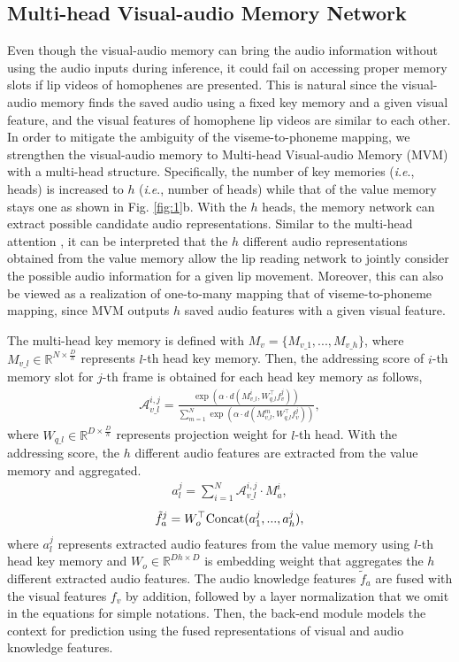 \documentclass[letterpaper]{article} \usepackage{aaai22}  \usepackage{times}  \usepackage{helvet}  \usepackage{courier}  \usepackage[hyphens]{url}  \usepackage{graphicx} \urlstyle{rm} \def\UrlFont{\rm}  \usepackage{natbib}  \usepackage{caption} \DeclareCaptionStyle{ruled}{labelfont=normalfont,labelsep=colon,strut=off} \frenchspacing  \setlength{\pdfpagewidth}{8.5in}  \setlength{\pdfpageheight}{11in}  \usepackage{algorithm}
\newcommand{\ie}{\textit{i}.\textit{e}.}
\begin{document}
\subsection{Multi-head Visual-audio Memory Network}
\label{sec:3.2}
Even though the visual-audio memory can bring the audio information without using the audio inputs during inference, it could fail on accessing proper memory slots if lip videos of homophenes are presented. This is natural since the visual-audio memory finds the saved audio using a fixed key memory and a given visual feature, and the visual features of homophene lip videos are similar to each other. In order to mitigate the ambiguity of the viseme-to-phoneme mapping, we strengthen the visual-audio memory to Multi-head Visual-audio Memory (MVM) with a multi-head structure. Specifically, the number of key memories (\ie, heads) is increased to $h$ (\ie, number of heads) while that of the value memory stays one \cite{lample2019mhmattention} as shown in Fig. \ref{fig:1}b. With the $h$ heads, the memory network can extract possible candidate audio representations. Similar to the multi-head attention \cite{vaswani2017attention}, it can be interpreted that the $h$ different audio representations obtained from the value memory allow the lip reading network to jointly consider the possible audio information for a given lip movement. Moreover, this can also be viewed as a realization of one-to-many mapping that of viseme-to-phoneme mapping, since MVM outputs $h$ saved audio features with a given visual feature.

The multi-head key memory is defined with $M_v=\{M_{v\_1}, ..., M_{v\_h}\}$, where $M_{v\_l}\in\mathbb{R}^{N\times \frac{D}{h}}$ represents $l$-th head key memory. Then, the addressing score of $i$-th memory slot for $j$-th frame is obtained for each head key memory as follows,
\begin{align}
    \mathcal{A}_{v\_l}^{i,j} = \frac{\exp(\alpha\cdot d(M_{v\_l}^i,W_{q\_l}^\top f_v^j))}{\sum_{m=1}^N \exp(\alpha\cdot d(M_{v\_l}^m,W_{q\_l}^\top f_v^j))},
\end{align}
where $W_{q\_l}\in\mathbb{R}^{D\times\frac{D}{h}}$ represents projection weight for $l$-th head. With the addressing score, the $h$ different audio features are extracted from the value memory and aggregated.
\begin{align}
    a_l^j = \sum_{i=1}^N\mathcal{A}_{v\_l}^{i,j} \cdot M_a^i,
\end{align}
\begin{align}
    \Tilde{f}_{a}^j = W_o^\top\text{Concat}(a_1^j,...,a_h^j),
\end{align}
where $a_l^j$ represents extracted audio features from the value memory using $l$-th head key memory and $W_o\in\mathbb{R}^{Dh \times D}$ is embedding weight that aggregates the $h$ different extracted audio features. The audio knowledge features $\tilde{f}_a$ are fused with the visual features $f_v$ by addition, followed by a layer normalization \cite{ba2016layernorm} that we omit in the equations for simple notations. Then, the back-end module models the context for prediction using the fused representations of visual and audio knowledge features.
\end{document}
